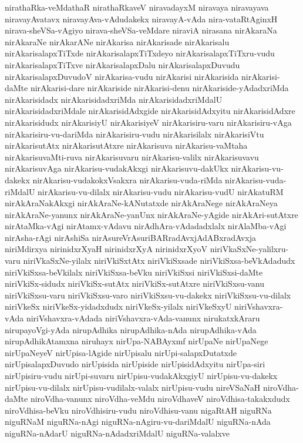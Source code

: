 {nirathaRka-veMdathaR
nirathaRkaveV
niravadayxM
niravaya
niravayava
niravayAvatavx
niravayAva-vAdudakekx
niravayA-vAda
nira-vataRtAginxH
nirava-sheVSa-vAgiyo
nirava-sheVSa-veMdare
niraviA
nirasana
nirAkaraNa
nirAkaraNe
nirAkarANe
nirAkarisa
nirAkarisade
nirAkarisalu
nirAkarisalapxTiTxde
nirAkarisalapxTiTxdeyo
nirAkarisalapxTiTxru-vudu
nirAkarisalapxTiTxve
nirAkarisalapxDalu
nirAkarisalapxDuvudu
nirAkarisalapxDuvudoV
nirAkarisa-vudu
nirAkarisi
nirAkarisida
nirAkarisi-daMte
nirAkarisi-dare
nirAkariside
nirAkarisi-denu
nirAkariside-yAdadxriMda
nirAkarisidadx
nirAkarisidadxriMda
nirAkarisidadxriMdalU
nirAkarisidadxriMdale
nirAkarisidAdxgide
nirAkarisidAdxyitu
nirAkarisidAdxre
nirAkarisidudx
nirAkarisiyU
nirAkarisiyeV
nirAkarisiru-varu
nirAkarisiru-vAga
nirAkarisiru-vu-dariMda
nirAkarisiru-vudu
nirAkarisilalx
nirAkarisiVtu
nirAkarisutAtx
nirAkarisutAtxre
nirAkarisuva
nirAkarisu-vaMtaha
nirAkarisuvaMti-ruva
nirAkarisuvaru
nirAkarisu-valilx
nirAkarisuvavu
nirAkarisuvAga
nirAkarisu-vudakAkxgi
nirAkarisuvu-dakUkx
nirAkarisu-vu-dakekx
nirAkarisu-vudakokxVsakxra
nirAkarisu-vuda-riMda
nirAkarisu-vuda-riMdalU
nirAkarisu-vu-dilalx
nirAkarisu-vudu
nirAkarisu-vudU
nirAkatuRM
nirAkAraNakAkxgi
nirAkAraNe-kANutatxde
nirAkAraNege
nirAkAraNeya
nirAkAraNe-yanunx
nirAkAraNe-yanUnx
nirAkAraNe-yAgide
nirAkAri-sutAtxre
nirAtaMka-vAgi
nirAtamx-vAdavu
nirAdhAra-vAdadadxlalx
nirAlaMba-vAgi
nirAsha-rAgi
nirAshiSa
nirAsureVrAsuriBARradAvxjAdABxradAvxja
niriMdirxya
nirinidxrXyaH
nirinidxrXyA
nirinidxrXyoV
niriVkaSxNe-yalilxru-varu
niriVkaSxNe-yilalx
niriVkiSxtAtx
niriVkiSxsade
niriVkiSxsa-beVkAdadudx
niriVkiSxsa-beVkilalx
niriVkiSxsa-beVku
niriVkiSxsi
niriVkiSxsi-daMte
niriVkiSx-sidudx
niriVkiSx-sutAtx
niriVkiSx-sutAtxre
niriVkiSxsu-vanu
niriVkiSxsu-varu
niriVkiSxsu-varo
niriVkiSxsu-vu-dakekx
niriVkiSxsu-vu-dilalx
niriVkeSx
niriVkeSx-yidadxdudx
niriVkeSx-yilalx
niriVkeSxyU
niriVshavxra-vAda
niriVshavxra-vAdada
niriVshavxra-vAda-vanunx
nirukatxkAraru
nirupayoVgi-yAda
nirupAdhika
nirupAdhika-nAda
nirupAdhika-vAda
nirupAdhikAtamxna
niruhayx
nirUpa-NABAyxmf
nirUpaNe
nirUpaNege
nirUpaNeyeV
nirUpisa-lAgide
nirUpisalu
nirUpi-salapxDutatxde
nirUpisalapxDuvudo
nirUpisida
nirUpiside
nirUpisidAdxyitu
nirUpa-siri
nirUpisiru-vudu
nirUpi-suvaru
nirUpisu-vudakAkxgiyU
nirUpisu-vu-dakekx
nirUpisu-vu-dilalx
nirUpisu-vudilalx-valalx
nirUpisu-vudu
nireVSaNaH
niroVdha-daMte
niroVdha-vanunx
niroVdha-veMdu
niroVdhaveV
niroVdhisa-takakxdudx
niroVdhisa-beVku
niroVdhisiru-vudu
niroVdhisu-vanu
nigaRtAH
niguRNa
niguRNaM
niguRNa-nAgi
niguRNa-nAgiru-vu-dariMdalU
niguRNa-nAda
niguRNa-nAdarU
niguRNa-nAdadxriMdalU
niguRNa-valalxve
}
